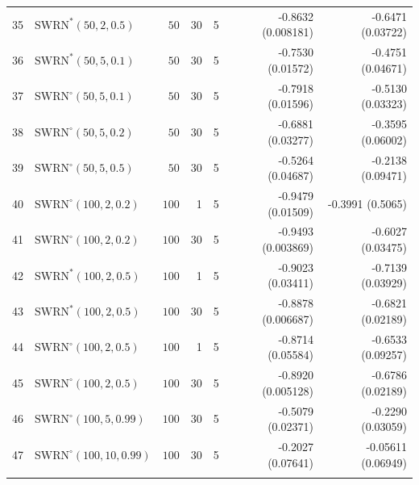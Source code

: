 \documentclass[review]{elsarticle}
\numberwithin{equation}{section}
\begin{document}
\begin{table}
\begin{center}
{\begin{tabular}{l|lrrrrr}
35  & $\mathrm{SWRN}^*(50,2,0.5)$ & $50$ & 30 & 5 & -0.8632 (0.008181) & -0.6471 (0.03722) \\
36  & $\mathrm{SWRN}^*(50,5,0.1)$ & $50$ & 30 & 5 & -0.7530 (0.01572) & -0.4751 (0.04671) \\
37  & $\mathrm{SWRN}^{\circ}(50,5,0.1)$ & $50$ & 30 & 5 & -0.7918 (0.01596)  & -0.5130 (0.03323) \\
38  & $\mathrm{SWRN}^{\circ}(50,5,0.2)$ & $50$ & 30 & 5 & -0.6881 (0.03277) & -0.3595 (0.06002) \\
39  & $\mathrm{SWRN}^{\circ}(50,5,0.5)$ & $50$ & 30 & 5 & -0.5264 (0.04687) & -0.2138 (0.09471) \\
40  & $\mathrm{SWRN}^{\circ}(100,2,0.2)$ & $100$ & 1 & 5 &  -0.9479 (0.01509) & -0.3991 (0.5065) \\
41  & $\mathrm{SWRN}^{\circ}(100,2,0.2)$ & $100$ & 30 & 5 &  -0.9493 (0.003869) & -0.6027 (0.03475) \\
42  & $\mathrm{SWRN}^*(100,2,0.5)$ & $100$ & 1 & 5 &  -0.9023 (0.03411)   & -0.7139 (0.03929) \\
43  & $\mathrm{SWRN}^*(100,2,0.5)$ & $100$ & 30 & 5 &  -0.8878 (0.006687) & -0.6821 (0.02189) \\
44  & $\mathrm{SWRN}^{\circ}(100,2,0.5)$ & $100$ & 1 & 5 & -0.8714 (0.05584) & -0.6533 (0.09257) \\
45  & $\mathrm{SWRN}^{\circ}(100,2,0.5)$ & $100$ & 30 & 5 & -0.8920 (0.005128) & -0.6786 (0.02189) \\
46  & $\mathrm{SWRN}^{\circ}(100,5,0.99)$ & $100$ & 30 & 5 &  -0.5079 (0.02371) & -0.2290 (0.03059) \\
47  & $\mathrm{SWRN}^{\circ}(100,10,0.99)$ & $100$ & 30 & 5 &  -0.2027 (0.07641) & -0.05611 (0.06949) \\
\hline\\

\end{tabular}}
\end{center}
\end{table}
\end{document}
